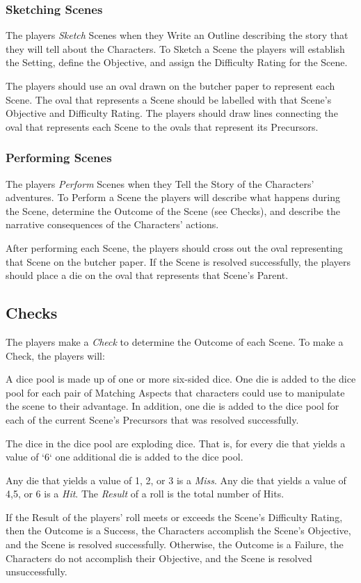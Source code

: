 \documentclass[12pt, a5paper, parskip=half-]{scrartcl}
\begin{document}
\subsubsection*{Sketching Scenes}
The players \emph{Sketch} Scenes when they Write an Outline describing the story that they will tell about the Characters. To Sketch a Scene the players will establish the Setting, define the Objective, and assign the Difficulty Rating for the Scene.

The players should use an oval drawn on the butcher paper to represent each Scene. The oval that represents a Scene should be labelled with that Scene's Objective and Difficulty Rating.  The players should draw lines connecting the oval that represents each Scene to the ovals that represent its Precursors.


\subsubsection*{Performing Scenes}
The players \emph{Perform} Scenes when they Tell the Story of the Characters' adventures.
To Perform a Scene the players will describe what happens during the Scene, determine the Outcome of the Scene (see Checks), and describe the narrative consequences of the Characters' actions.

After performing each Scene, the players should cross out the oval representing that Scene on the butcher paper. If the Scene is resolved successfully, the players should place a die on the oval that represents that Scene's Parent.
\newpage

\subsection*{Checks}
The players make a \emph{Check} to determine the Outcome of each Scene. To make a Check, the players will:
\begin{description}[leftmargin=0pt]
\item[Assemble a Dice Pool]
     A dice pool is made up of one or more six-sided dice.
     One die is added to the dice pool for each pair of Matching Aspects that characters could use to manipulate the scene to their advantage.
     In addition, one die is added to the dice pool for each of the current Scene's Precursors that was resolved successfully.
 \item[Roll the Dice]
     The dice in the dice pool are exploding dice.
     That is, for every die that yields a value of `6` one additional die is added to the dice pool.
\item[Compute the Result]
     Any die that yields a value of 1, 2, or 3 is a \emph{Miss}.
     Any die that yields a value of 4,5, or 6 is a \emph{Hit}.
     The \emph{Result} of a roll is the total number of Hits.
\item[Determine the Outcome]
     If the Result of the players' roll meets or exceeds the Scene's Difficulty Rating, then the Outcome is a Success, the Characters accomplish the Scene's Objective, and the Scene is resolved successfully.
     Otherwise, the Outcome is a Failure, the Characters do not accomplish their Objective, and the Scene is resolved unsuccessfully.
 \end{description}
\end{document}
